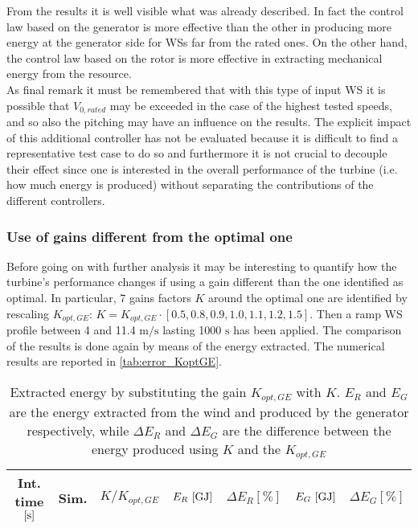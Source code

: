 From the results it is well visible what was already described. In fact the control law based on the generator is more effective than the other in producing more energy at the generator side for WSs far from the rated ones. On the other hand, the control law based on the rotor is more effective in extracting mechanical energy from the resource. \\
As final remark it must be remembered that with this type of input WS it is possible that $V_{0,rated}$ may be exceeded in the case of the highest tested speeds, and so also the pitching may have an influence on the results. The explicit impact of this additional controller has not be evaluated because it is difficult to find a representative test case to do so and furthermore it is not crucial to decouple their effect since one is interested in the overall performance of the turbine (i.e. how much energy is produced) without separating the contributions of the different controllers. 

\subsubsection{Use of gains different from the optimal one}\label{subsec:c_different_KoptGE}
Before going on with further analysis it may be interesting to quantify how the turbine's performance changes if using a gain different than the one identified as optimal. In particular, 7 gains factors $K$ around the optimal one are identified by rescaling $K_{opt,GE}$: $K= K_{opt,GE} \cdot \left[0.5, 0.8, 0.9, 1.0, 1.1, 1.2, 1.5\right]$. Then a ramp WS profile between 4 and 11.4 $\si{\meter\per\second}$ lasting 1000 $\si{\second}$ has been applied. The comparison of the results is done again by means of the energy extracted. The numerical results are reported in \autoref{tab:error_KoptGE}. 

\begin{table}[!htbp]
  \caption{Extracted energy by substituting the gain $K_{opt,GE}$ with $K$. $E_R$ and $E_G$ are the energy extracted from the wind and produced by the generator respectively, while $\Delta E_R$ and $\Delta E_G$ are the difference between the energy produced using $K$ and the $K_{opt,GE}$}
  \centering
  \begin{tabular}{ccccccc}
  \toprule
  Int. time $\left[\si{\second}\right]$ & Sim. & $K/K_{opt,GE}$ & $E_R \, \left[\si{\giga\joule}\right]$ & $\Delta E_R \left[\%\right]$ & $E_G \, \left[\si{\giga\joule}\right]$ & $\Delta E_G \left[\%\right]$\\ 
   \midrule
  
  \end{tabular}
  \label{tab:error_KoptGE}
\end{table}


